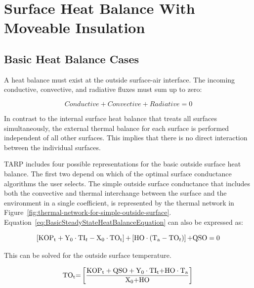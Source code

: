 \section{Surface Heat Balance With Moveable Insulation}\label{surface-heat-balance-with-moveable-insulation}

\subsection{Basic Heat Balance Cases}\label{basic-heat-balance-cases}

A heat balance must exist at the outside surface-air interface. The incoming conductive, convective, and radiative fluxes must sum up to zero:

\begin{equation}
Conductive + Convective + Radiative = 0
\label{eq:BasicSteadyStateHeatBalanceEquation}
\end{equation}

In contrast to the internal surface heat balance that treats all surfaces simultaneously, the external thermal balance for each surface is performed independent of all other surfaces. This implies that there is no direct interaction between the individual surfaces.

TARP includes four possible representations for the basic outside surface heat balance. The first two depend on which of the optimal surface conductance algorithms the user selects. The simple outside surface conductance that includes both the convective and thermal interchange between the surface and the environment in a single coefficient, is represented by the thermal network in Figure~\ref{fig:thermal-network-for-simple-outside-surface}. Equation~\ref{eq:BasicSteadyStateHeatBalanceEquation} can also be expressed as:

\begin{equation}
\left[ {{\rm{KO}}{{\rm{P}}_{\rm{t}}} + {{\rm{Y}}_{\rm{0}}}\cdot {\rm{T}}{{\rm{I}}_t} - {{\rm{X}}_{\rm{0}}}\cdot {\rm{T}}{{\rm{O}}_{\rm{t}}}} \right]{\rm{ + }}\left[ {{\rm{HO}}\cdot \left( {{{\rm{T}}_{\rm{a}}} - {\rm{T}}{{\rm{O}}_t}} \right)} \right]{\rm{  + QSO  =  0}}
\end{equation}

This can be solved for the outside surface temperature.

\begin{equation}
{\rm{T}}{{\rm{O}}_{\rm{t}}}{\rm{ = }}\left[ {\frac{{{\rm{KO}}{{\rm{P}}_{\rm{t}}} + {\rm{QSO}} + {{\rm{Y}}_0}\cdot {\rm{T}}{{\rm{I}}_{\rm{t}}}{\rm{ + HO}}\cdot {{\rm{T}}_{\rm{a}}}}}{{{{\rm{X}}_{\rm{0}}}{\rm{ + HO}}}}} \right]{\rm{  }}
\label{eq:OutsideSurfTempHeatBalEq}
\end{equation}

